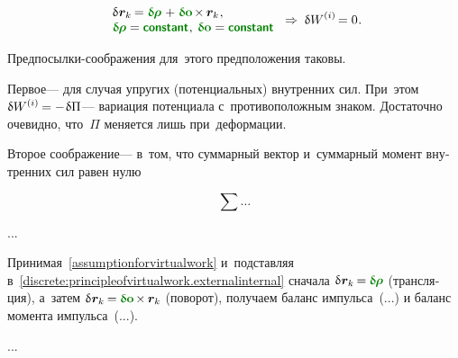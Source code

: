 \begin{otherlanguage}{russian}
\nopagebreak\vspace{-0.2em}\begin{equation}\label{assumptionforvirtualwork}
\begin{array}{l}
\variation{\hspace{.1ex}\bm{r}_k} \hspace{-0.16ex}
= \constvarvector{\hspace{-0.1ex}\bm{\rho}} \hspace{.2ex} + \hspace{.12ex} \constvarvector{\bm{o}} \hspace{-0.2ex} \times \hspace{-0.1ex} \bm{r}_k
\hspace{.1ex} ,
\\
\constvarvector{\hspace{-0.1ex}\bm{\rho}} = \boldconstant \hspace{.1ex} , \:
\constvarvector{\bm{o}} = \boldconstant
\end{array}
\hspace{.3ex} \Rightarrow \hspace{.6ex}
\variation{\internalwork} \hspace{-0.1ex} = 0 \hspace{.1ex}.
\end{equation}

\vspace{-0.1em} Предпосылки-соображения для~этого предположения таковы.

Первое\:--- для случая упругих (потенциальных) внутренних сил. При~этом ${\variation{\internalwork} = - \hspace{.16ex} \variation{\Pi}}$\:--- вариация потенциала с~противоположным знаком. Достаточно очевидно, что~$\Pi$ меняется лишь при~деформации.

Второе соображение\:--- в~том, что суммарный вектор и~суммарный момент внутренних сил равен нулю

\begin{equation*}
\sum \ldots
\end{equation*}

...

Принимая~\eqref{assumptionforvirtualwork} и~подставляя в~\eqref{discrete:principleofvirtualwork.externalinternal} сначала ${\variation{\hspace{.1ex}\bm{r}_k} \hspace{-0.16ex} = \hspace{-0.08ex} \constvarvector{\hspace{-0.1ex}\bm{\rho}}}$ (трансляция), а~затем ${\variation{\hspace{.1ex}\bm{r}_k} \hspace{-0.16ex} = \hspace{-0.08ex} \constvarvector{\bm{o}} \hspace{-0.2ex} \times \hspace{-0.1ex} \bm{r}_k}$ (поворот), получаем баланс импульса~(...) и баланс момента импульса~(...).

...



\end{otherlanguage}


